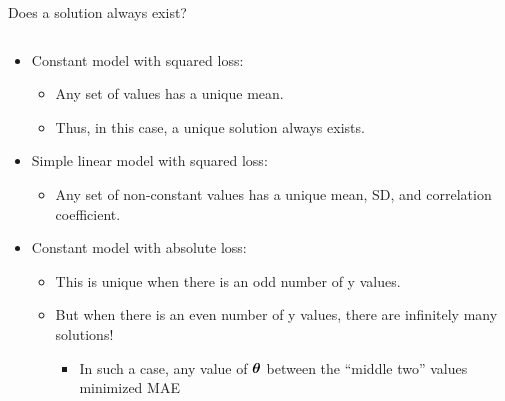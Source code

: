 \documentclass[aspectratio=169]{../latex_main/tntbeamer}  %
\begin{document}
	\begin{frame}{Does a solution always exist?}
	
	    \vspace{-2em}
	    \begin{columns}
	    
	        \begin{column}{.6\textwidth}
	        
	                \begin{itemize}
	                    \item Constant model with squared loss: 
	                    \begin{itemize}
	                        \item Any set of values has a unique mean.
	                        \item Thus, in this case, a unique solution always exists.
	                    \end{itemize}
	                    \item Simple linear model with squared loss: 
                        \begin{itemize}
                            \item Any set of non-constant values has a unique mean, SD, and correlation coefficient.
                        \end{itemize}
                        \item Constant model with absolute loss:
                        \begin{itemize}
                            \item This is unique when there is an odd number of y values.
                            \item But when there is an even number of y values, there are infinitely many solutions!
                            \begin{itemize}
                                \item In such a case, any value of $\bm{\theta}$ between the “middle two” values minimized MAE
                            \end{itemize}
                        \end{itemize}
                        
	                \end{itemize}
	                
	        \end{column}
	        
	        
	        

\end{columns}
\end{frame}
\end{document}
